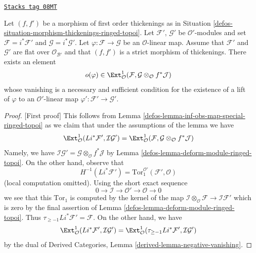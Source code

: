 \begin{lemma}
\label{defos-lemma-inf-obs-map-rel-ringed-topoi}
\href{https://stacks.math.columbia.edu/tag/08MT}{\texttt{Stacks tag 08MT}}

Let $(f, f')$ be a morphism of first order thickenings as in
Situation \ref{defos-situation-morphism-thickenings-ringed-topoi}.
Let $\mathcal{F}'$, $\mathcal{G}'$ be $\mathcal{O}'$-modules and set
$\mathcal{F} = i^*\mathcal{F}'$ and $\mathcal{G} = i^*\mathcal{G}'$.
Let $\varphi : \mathcal{F} \to \mathcal{G}$ be an $\mathcal{O}$-linear map.
Assume that $\mathcal{F}'$ and $\mathcal{G}'$ are flat over
$\mathcal{O}_{\mathcal{B}'}$ and
that $(f, f')$ is a strict morphism of thickenings. There exists an element
$$
o(\varphi) \in
\Ext^1_\mathcal{O}(\mathcal{F},
\mathcal{G} \otimes_\mathcal{O} f^*\mathcal{J})
$$
whose vanishing is a necessary and sufficient condition for the
existence of a lift of $\varphi$ to an $\mathcal{O}'$-linear map
$\varphi' : \mathcal{F}' \to \mathcal{G}'$.
\end{lemma}

\begin{proof}
[First proof]
This follows from Lemma \ref{defos-lemma-inf-obs-map-special-ringed-topoi}
as we claim that under the assumptions of the lemma we have
$$
\Ext^1_\mathcal{O}(Li^*\mathcal{F}', \mathcal{I}\mathcal{G}') =
\Ext^1_\mathcal{O}(\mathcal{F},
\mathcal{G} \otimes_\mathcal{O} f^*\mathcal{J})
$$
Namely, we have
$\mathcal{I}\mathcal{G}' =
\mathcal{G} \otimes_\mathcal{O} f^*\mathcal{J}$
by Lemma \ref{defos-lemma-deform-module-ringed-topoi}.
On the other hand, observe that
$$
H^{-1}(Li^*\mathcal{F}') =
\text{Tor}_1^{\mathcal{O}'}(\mathcal{F}', \mathcal{O})
$$
(local computation omitted). Using the short exact sequence
$$
0 \to \mathcal{I} \to \mathcal{O}' \to \mathcal{O} \to 0
$$
we see that this $\text{Tor}_1$ is computed by the kernel of the map
$\mathcal{I} \otimes_\mathcal{O} \mathcal{F} \to \mathcal{I}\mathcal{F}'$
which is zero by the final assertion of
Lemma \ref{defos-lemma-deform-module-ringed-topoi}.
Thus $\tau_{\geq -1}Li^*\mathcal{F}' = \mathcal{F}$.
On the other hand, we have
$$
\Ext^1_\mathcal{O}(Li^*\mathcal{F}',
\mathcal{I}\mathcal{G}') =
\Ext^1_\mathcal{O}(\tau_{\geq -1}Li^*\mathcal{F}',
\mathcal{I}\mathcal{G}')
$$
by the dual of
Derived Categories, Lemma \ref{derived-lemma-negative-vanishing}.
\end{proof}

